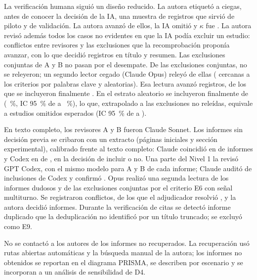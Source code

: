 La verificación humana siguió un diseño reducido. La autora etiquetó a ciegas, antes de conocer la decisión de la IA, una muestra de \nPiloto{} registros que sirvió de piloto y de validación. La autora avanzó \nPilotoAvanzaAutora{} de ellos, la IA omitió \nPilotoOmitidosIA{} y $\kappa$ fue \pilotoKappa{}. La autora revisó además todos los casos no evidentes en que la IA podía excluir un estudio: \nConflictosTR{} conflictos entre revisores y las exclusiones que la recomprobación proponía avanzar, con lo que decidió \nAutoraTR{} registros en título y resumen. Las exclusiones conjuntas de A y B no pasan por el desempate. De las \nConjuntas{} exclusiones conjuntas, \nNoReleidas{} no se releyeron; un segundo lector cegado (Claude Opus) releyó \nQC{} de ellas (\nQCCercanos{} cercanas a los criterios por palabras clave y \nQCAleatorios{} aleatorias). %
Esa lectura avanzó \nQCAvanzados{} registros, de los que se incluyeron finalmente \nQCIncluidos{}. En el estrato aleatorio se incluyeron finalmente \nRescAleat{} de \nAleatRel{} (\tasaRescate~\%, IC 95~\% de \tasaRescateInf{} a \tasaRescateSup~\%), lo que, extrapolado a las exclusiones no releídas, equivale a \omisEsp{} estudios omitidos esperados (IC 95~\% de \omisEspInf{} a \omisEspSup{}).

En texto completo, los revisores A y B fueron Claude Sonnet. Los informes sin decisión previa se cribaron con un extracto (páginas iniciales y sección experimental), calibrado frente al texto completo: Claude coincidió en \nCalibClaude{} de \nCalibN{} informes y Codex en \nCalibCodex{} de \nCalibN{}, en la decisión de incluir o no. Una parte del Nivel 1 la revisó GPT Codex, con el mismo modelo para A y B de cada informe; Claude auditó \nAuditN{} de \nAuditPool{} inclusiones de Codex y confirmó \nAuditOK{}. Opus realizó una segunda lectura de los \nQCTCdudosos{} informes dudosos y de las \nQCTCmt{} exclusiones conjuntas por el criterio E6 con señal multiturno. Se registraron \nConflictosTC{} conflictos, de los que el adjudicador resolvió \nAdjTC{}, y la autora decidió \nAutoraTC{} informes. Durante la verificación de citas se detectó \nDupVerifCitas{} informe duplicado que la deduplicación no identificó por un título truncado; se excluyó como E9.

No se contactó a los autores de los informes no recuperados. La recuperación usó rutas abiertas automáticas y la búsqueda manual de la autora; los informes no obtenidos se reportan en el diagrama PRISMA, se describen por escenario y se incorporan a un análisis de sensibilidad de D4.


